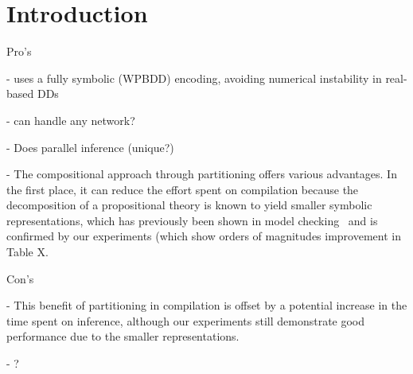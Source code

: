 
\section{Introduction}
\label{sec:introduction}




Pro's

- uses a fully symbolic (WPBDD) encoding, avoiding numerical instability in real-based DDs

- can handle any network?

- Does parallel inference (unique?)

- The compositional approach through partitioning offers various advantages. In the first place, it can reduce the effort spent on compilation because the decomposition of a propositional theory is known to yield smaller symbolic representations, which has previously been shown in model checking~\cite{narayan1996partitioned,sahoo2004partitioning,grumberg2006work} and is confirmed by our experiments (which show orders of magnitudes improvement in Table X.


Con's 

- This benefit of partitioning in compilation is offset by a potential increase in the time spent on inference, although our experiments still demonstrate good performance due to the smaller representations.

-  ?
